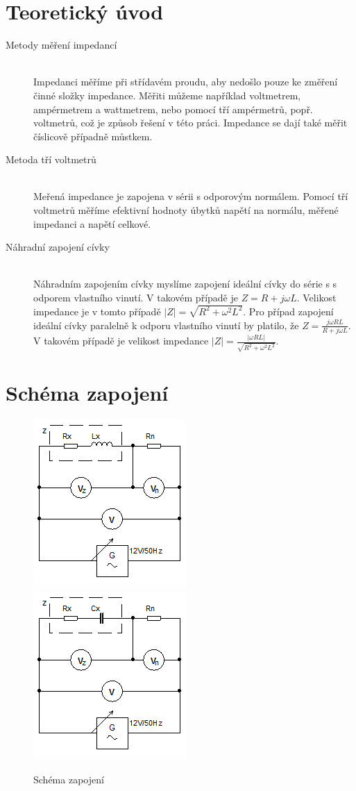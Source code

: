 \documentclass[12pt]{article} %
\begin{document}
\section{Teoretický úvod}
\begin{description}
\item[Metody měření impedancí] \hfill \\
Impedanci měříme při střídavém proudu, aby nedošlo pouze ke změření činné složky impedance. Měřiti můžeme například voltmetrem, ampérmetrem a wattmetrem, nebo pomocí tří ampérmetrů, popř. voltmetrů, což je způsob řešení v této práci. Impedance se dají také měřit číslicově případně můstkem.
\item[Metoda tří voltmetrů] \hfill \\
Meřená impedance je zapojena v sérii s odporovým normálem. Pomocí tří voltmetrů měříme efektivní hodnoty úbytků napětí na normálu, měřené impedanci a napětí celkové.
\item[Náhradní zapojení cívky] \hfill \\
Náhradním zapojením cívky myslíme zapojení ideální cívky do série s s odporem vlastního vinutí. V takovém případě je $Z=R+j\omega L$. Velikost impedance je v tomto případě $|Z|=\sqrt{R^2 + \omega^2 L^2}$. Pro případ zapojení ideální cívky paralelně k odporu vlastního vinutí by platilo, že $Z=\frac{j\omega RL}{R+j\omega L}$. V takovém případě je velikost impedance $|Z|=\frac{|\omega RL|}{\sqrt{R^2 + \omega^2 L^2}}$.
\end{description}

\section{Schéma zapojení}
\begin{figure}[H]
\center
\includegraphics[scale=1]{schema.png}
\includegraphics[scale=1]{schema2.png}
\caption{Schéma zapojení}
\end{figure}
\end{document}
